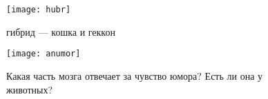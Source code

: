 \begin{figure}[ht!]
    \centering
    \texttt{[image: hubr]}
    \caption{гибрид --- кошка и геккон}
\end{figure}

\begin{figure}[ht!]
    \centering
    \texttt{[image: anumor]}
    \caption{Какая часть мозга отвечает за чувство юмора? Есть ли она у животных?}
\end{figure}
